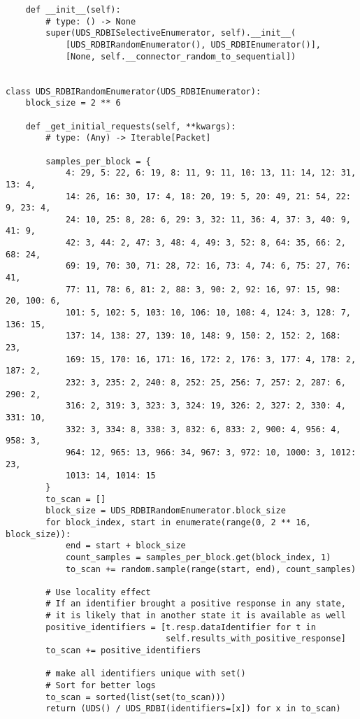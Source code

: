 \begin{verbatim}
    def __init__(self):
        # type: () -> None
        super(UDS_RDBISelectiveEnumerator, self).__init__(
            [UDS_RDBIRandomEnumerator(), UDS_RDBIEnumerator()],
            [None, self.__connector_random_to_sequential])


class UDS_RDBIRandomEnumerator(UDS_RDBIEnumerator):
    block_size = 2 ** 6

    def _get_initial_requests(self, **kwargs):
        # type: (Any) -> Iterable[Packet]

        samples_per_block = {
            4: 29, 5: 22, 6: 19, 8: 11, 9: 11, 10: 13, 11: 14, 12: 31, 13: 4,
            14: 26, 16: 30, 17: 4, 18: 20, 19: 5, 20: 49, 21: 54, 22: 9, 23: 4,
            24: 10, 25: 8, 28: 6, 29: 3, 32: 11, 36: 4, 37: 3, 40: 9, 41: 9,
            42: 3, 44: 2, 47: 3, 48: 4, 49: 3, 52: 8, 64: 35, 66: 2, 68: 24,
            69: 19, 70: 30, 71: 28, 72: 16, 73: 4, 74: 6, 75: 27, 76: 41,
            77: 11, 78: 6, 81: 2, 88: 3, 90: 2, 92: 16, 97: 15, 98: 20, 100: 6,
            101: 5, 102: 5, 103: 10, 106: 10, 108: 4, 124: 3, 128: 7, 136: 15,
            137: 14, 138: 27, 139: 10, 148: 9, 150: 2, 152: 2, 168: 23,
            169: 15, 170: 16, 171: 16, 172: 2, 176: 3, 177: 4, 178: 2, 187: 2,
            232: 3, 235: 2, 240: 8, 252: 25, 256: 7, 257: 2, 287: 6, 290: 2,
            316: 2, 319: 3, 323: 3, 324: 19, 326: 2, 327: 2, 330: 4, 331: 10,
            332: 3, 334: 8, 338: 3, 832: 6, 833: 2, 900: 4, 956: 4, 958: 3,
            964: 12, 965: 13, 966: 34, 967: 3, 972: 10, 1000: 3, 1012: 23,
            1013: 14, 1014: 15
        }
        to_scan = []
        block_size = UDS_RDBIRandomEnumerator.block_size
        for block_index, start in enumerate(range(0, 2 ** 16, block_size)):
            end = start + block_size
            count_samples = samples_per_block.get(block_index, 1)
            to_scan += random.sample(range(start, end), count_samples)

        # Use locality effect
        # If an identifier brought a positive response in any state,
        # it is likely that in another state it is available as well
        positive_identifiers = [t.resp.dataIdentifier for t in
                                self.results_with_positive_response]
        to_scan += positive_identifiers

        # make all identifiers unique with set()
        # Sort for better logs
        to_scan = sorted(list(set(to_scan)))
        return (UDS() / UDS_RDBI(identifiers=[x]) for x in to_scan)
\end{verbatim}

